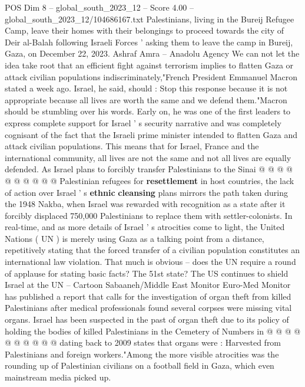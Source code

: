 \begin{textsample}{POS Dim 8 – global\_south\_2023\_12 – Score 4.00 – global\_south\_2023\_12/104686167.txt}  \label{ex:f8_pos_431}
Palestinians, living in the Bureij Refugee Camp, leave their homes with their belongings to proceed towards the city of Deir al-Balah following Israeli Forces ' asking them to leave the camp in Bureij, Gaza, on December 22, 2023.
Ashraf Amra -- Anadolu Agency We can not let the idea take root that an efficient fight against terrorism implies to flatten Gaza or attack civilian populations indiscriminately,"French President Emmanuel Macron stated a week ago.
Israel, he said, should : Stop this response because it is not appropriate because all lives are worth the same and we defend them."Macron should be stumbling over his words.
Early on, he was one of the first leaders to express complete support for Israel ' s security narrative and was completely cognisant of the fact that the Israeli prime minister intended to flatten Gaza and attack civilian populations.
This means that for Israel, France and the international community, all lives are not the same and not all lives are equally defended.
As Israel plans to forcibly transfer Palestinians to the Sinai @ @ @ @ @ @ @ @ @ @ Palestinian refugees for \textbf{resettlement} in host countries, the lack of action over Israel ' s \textbf{ethnic} \textbf{cleansing} plans mirrors the path taken during the 1948 Nakba, when Israel was rewarded with recognition as a state after it forcibly displaced 750,000 Palestinians to replace them with settler-colonists.
In real-time, and as more details of Israel ' s atrocities come to light, the United Nations ( UN ) is merely using Gaza as a talking point from a distance, repetitively stating that the forced transfer of a civilian population constitutes an international law violation.
That much is obvious -- does the UN require a round of applause for stating basic facts?
The 51st state?
The US continues to shield Israel at the UN -- Cartoon Sabaaneh/Middle East Monitor Euro-Med Monitor has published a report that calls for the investigation of organ theft from killed Palestinians after medical professionals found several corpses were missing vital organs.
Israel has been suspected in the past of organ theft due to its policy of holding the bodies of killed Palestinians in the Cemetery of Numbers in @ @ @ @ @ @ @ @ @ @ dating back to 2009 states that organs were : Harvested from Palestinians and foreign workers."Among the more visible atrocities was the rounding up of Palestinian civilians on a football field in Gaza, which even mainstream media picked up.

\end{textsample}

